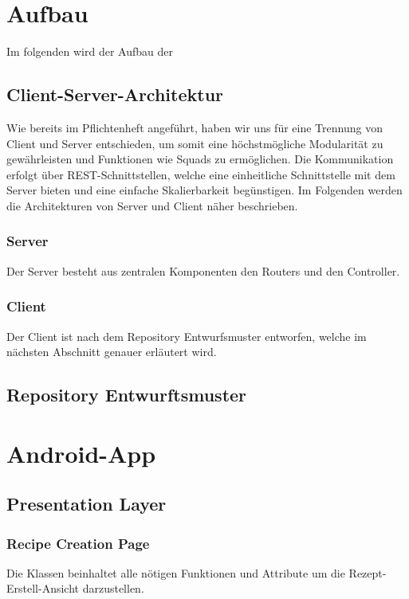 \documentclass[parskip=full]{scrartcl}
\begin{document}
\section{Aufbau}
Im folgenden wird der Aufbau der

\subsection{Client-Server-Architektur}
Wie bereits im Pflichtenheft angeführt, haben wir uns für eine Trennung von Client und Server entschieden, um somit eine höchstmögliche Modularität zu gewährleisten und
Funktionen wie Squads zu ermöglichen. Die Kommunikation erfolgt über REST-Schnittstellen, welche eine einheitliche Schnittstelle mit dem Server bieten und eine einfache Skalierbarkeit begünstigen.
Im Folgenden werden die Architekturen von Server und Client näher beschrieben.


\subsubsection{Server}
Der Server besteht aus zentralen Komponenten den Routers und den Controller. 
\subsubsection{Client}
Der Client ist nach dem Repository Entwurfsmuster entworfen, welche im nächsten Abschnitt genauer erläutert wird.

\subsection{Repository Entwurftsmuster}

\section{Android-App}
\subsection{Presentation Layer}
    \newpage
    \subsubsection{Recipe Creation Page}
        Die Klassen beinhaltet alle nötigen Funktionen und Attribute um die Rezept-Erstell-Ansicht darzustellen.\newline
\end{document}
